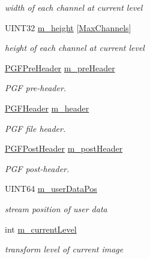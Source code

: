 \begin{DoxyCompactItemize}
\begin{DoxyCompactList}\small\item\em width of each channel at current level \end{DoxyCompactList}\item 
U\+I\+N\+T32 \mbox{\hyperlink{classCPGFImage_a170fd448152303a2d44848a52a8916a0}{m\+\_\+height}} \mbox{[}\mbox{\hyperlink{PGFtypes_8h_a94219182f88d4dbed1021ed04db75e41}{Max\+Channels}}\mbox{]}
\begin{DoxyCompactList}\small\item\em height of each channel at current level \end{DoxyCompactList}\item 
\mbox{\hyperlink{structPGFPreHeader}{P\+G\+F\+Pre\+Header}} \mbox{\hyperlink{classCPGFImage_ad5ed0ec587742ebf46f72be4abde305d}{m\+\_\+pre\+Header}}
\begin{DoxyCompactList}\small\item\em P\+GF pre-\/header. \end{DoxyCompactList}\item 
\mbox{\hyperlink{structPGFHeader}{P\+G\+F\+Header}} \mbox{\hyperlink{classCPGFImage_a1a45b90decf13d8e8243bd84bac690d0}{m\+\_\+header}}
\begin{DoxyCompactList}\small\item\em P\+GF file header. \end{DoxyCompactList}\item 
\mbox{\hyperlink{structPGFPostHeader}{P\+G\+F\+Post\+Header}} \mbox{\hyperlink{classCPGFImage_ab8635df22839ffb68bada53e38b9ce73}{m\+\_\+post\+Header}}
\begin{DoxyCompactList}\small\item\em P\+GF post-\/header. \end{DoxyCompactList}\item 
U\+I\+N\+T64 \mbox{\hyperlink{classCPGFImage_acf4ae6e169ddf84e32cf9b57a22800b3}{m\+\_\+user\+Data\+Pos}}
\begin{DoxyCompactList}\small\item\em stream position of user data \end{DoxyCompactList}\item 
int \mbox{\hyperlink{classCPGFImage_a2790b468b6d4841cd34473c4b61d0c7f}{m\+\_\+current\+Level}}
\begin{DoxyCompactList}\small\item\em transform level of current image \end{DoxyCompactList}\item 

\end{DoxyCompactItemize}
